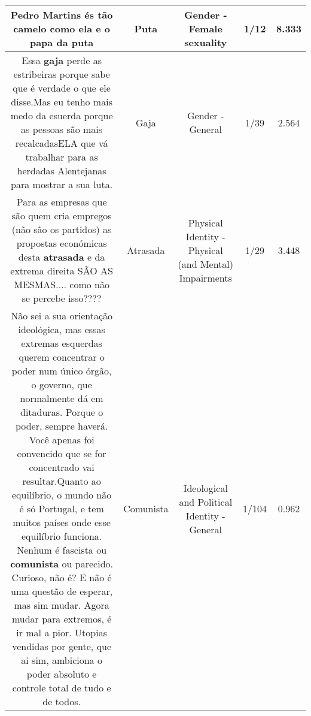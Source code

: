\documentclass[11pt]{article}
\newlength\mylength
\begin{document}
\begin{center}
\begin{longtable}{|C{.65\mylength}|C{.30\mylength}|C{.12\mylength}|C{.12\mylength}|C{.12\mylength}|}
  \small Pedro Martins és tão camelo como ela e o papa da puta\normalsize   & Puta & Gender - Female sexuality & 1/12 & 8.333 \\  \hline
  \small Essa \textbf{gaja} perde as estribeiras porque sabe que é  verdade o que ele disse.Mas eu tenho mais medo da esuerda porque as pessoas são mais recalcadasELA que vá trabalhar para as herdadas Alentejanas para mostrar a sua luta.\normalsize   & Gaja & Gender - General & 1/39 & 2.564 \\  \hline
  \small Para as empresas que são quem cria empregos (não são os partidos) as propostas económicas desta \textbf{atrasada} e da extrema direita SÃO AS MESMAS.... como não se percebe isso????\normalsize   & Atrasada & Physical Identity - Physical (and Mental) Impairments & 1/29 & 3.448 \\  \hline
  \small Não sei a sua orientação ideológica, mas essas extremas esquerdas querem concentrar o poder num único órgão, o governo, que normalmente dá em ditaduras. Porque o poder, sempre haverá. Você apenas foi convencido que se for concentrado vai resultar.Quanto ao equilíbrio, o mundo não é só Portugal, e tem muitos países onde esse equilíbrio funciona. Nenhum é fascista ou \textbf{comunista} ou parecido. Curioso, não é? E não é uma questão de esperar, mas sim mudar. Agora mudar para extremos, é ir mal a pior. Utopias vendidas por gente, que ai sim, ambiciona o poder absoluto e controle total de tudo e de todos.\normalsize   & Comunista & Ideological and Political Identity - General & 1/104 & 0.962 \\  \hline

\end{longtable}
\end{center}
\end{document}
